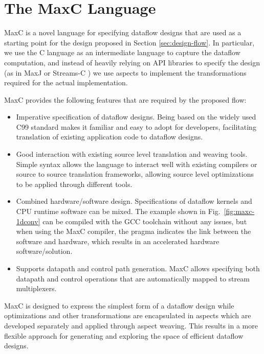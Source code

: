 \section{The  MaxC Language}
\label{sec:maxc}

MaxC is a novel language for specifying dataflow designs that are used
as a starting point for the design proposed in Section
\ref{sec:design-flow}. In particular, we use
the C language as an intermediate language to capture the dataflow computation, and instead
of heavily relying on API libraries to specify the design (as in MaxJ
\cite{MaxelerTechnologies:2012} or Streams-C
\cite{Gokhale:Stone:Arnold:Kalinowski:2000}) we use aspects to
implement the transformations required for the actual implementation.

MaxC provides the following features that are
required by the proposed flow:

\begin{itemize}
\item Imperative specification of dataflow designs. Being based on the
  widely used C99 standard makes it familiar and easy to adopt for
  developers, facilitating translation of existing application code to
  dataflow designs.
\item Good interaction with existing source level translation and
  weaving tools. Simple syntax allows the language to interact well
  with existing compilers or source to source translation frameworks,
  allowing source level optimizations to be applied through different
  tools.
\item Combined hardware/software design. Specifications of dataflow
  kernels and CPU runtime software can be mixed. The example shown in
  Fig.~\ref{fig:maxc-1dconv} can be compiled with the GCC toolchain
  without any issues, but when using the MaxC compiler, the pragma
  indicates the link between the software and hardware, which results
  in an accelerated hardware software/solution.
\item Supports datapath and control path generation. MaxC allows
  specifying both datapath and control operations that are
  automatically mapped to stream multiplexers.
\end{itemize}

MaxC is designed to express the simplest form of a dataflow design
while optimizations and other transformations are encapsulated in
aspects which are developed separately and applied through aspect
weaving. This results in a more flexible approach for generating and
exploring the space of efficient dataflow designs.

